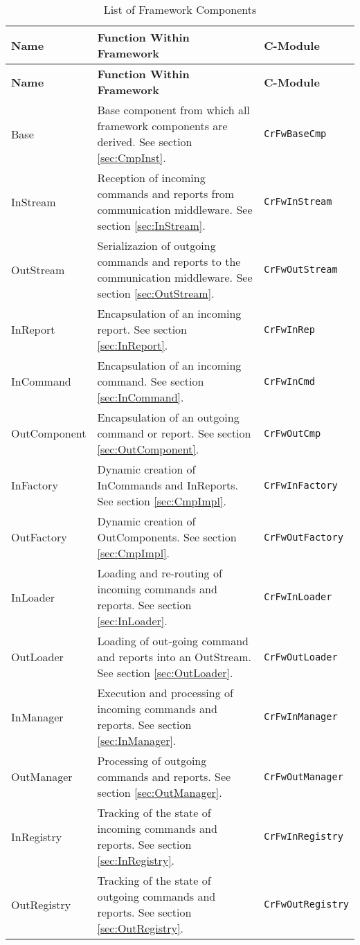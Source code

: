 \documentclass{pnp_article}
\begin{document}
\begin{longtable}{|p{2.4cm}|p{7.5cm}|p{2.7cm}|}
\caption{List of Framework Components} \label{tab:CmpList}\\
\hline
\rowcolor{light-gray}
\textbf{Name} & \textbf{Function Within Framework} & \textbf{C-Module} \\
\hline\hline
\endfirsthead
\rowcolor{light-gray}
\textbf{Name} & \textbf{Function Within Framework} & \textbf{C-Module} \\
\hline\hline
\endhead
Base & Base component from which all framework components are derived. See section \ref{sec:CmpInst}. & \texttt{CrFwBaseCmp} \\
\hline
InStream & Reception of incoming commands and reports from communication middleware. See section \ref{sec:InStream}. & \texttt{CrFwInStream} \\
\hline
OutStream & Serializazion of outgoing commands and reports to the communication middleware. See section \ref{sec:OutStream}. & \texttt{CrFwOutStream} \\
\hline
InReport & Encapsulation of an incoming report. See section \ref{sec:InReport}. & \texttt{CrFwInRep} \\
\hline
InCommand & Encapsulation of an incoming command. See section \ref{sec:InCommand}. & \texttt{CrFwInCmd} \\
\hline
OutComponent & Encapsulation of an outgoing command or report. See section \ref{sec:OutComponent}. & \texttt{CrFwOutCmp} \\
\hline
InFactory & Dynamic creation of InCommands and InReports. See section \ref{sec:CmpImpl}. & \texttt{CrFwInFactory} \\
\hline
OutFactory & Dynamic creation of OutComponents. See section \ref{sec:CmpImpl}. & \texttt{CrFwOutFactory} \\
\hline
InLoader & Loading and re-routing of incoming commands and reports. See section \ref{sec:InLoader}. & \texttt{CrFwInLoader} \\
\hline
OutLoader & Loading of out-going command and reports into an OutStream. See section \ref{sec:OutLoader}. & \texttt{CrFwOutLoader} \\
\hline
InManager & Execution and processing of incoming commands and reports. See section \ref{sec:InManager}. & \texttt{CrFwInManager} \\
\hline
OutManager & Processing of outgoing commands and reports. See section \ref{sec:OutManager}. & \texttt{CrFwOutManager} \\
\hline
InRegistry & Tracking of the state of incoming commands and reports. See section \ref{sec:InRegistry}. & \texttt{CrFwInRegistry} \\
\hline
OutRegistry & Tracking of the state of outgoing commands and reports. See section \ref{sec:OutRegistry}. & \texttt{CrFwOutRegistry} \\
\hline
\end{longtable}
\end{document}
